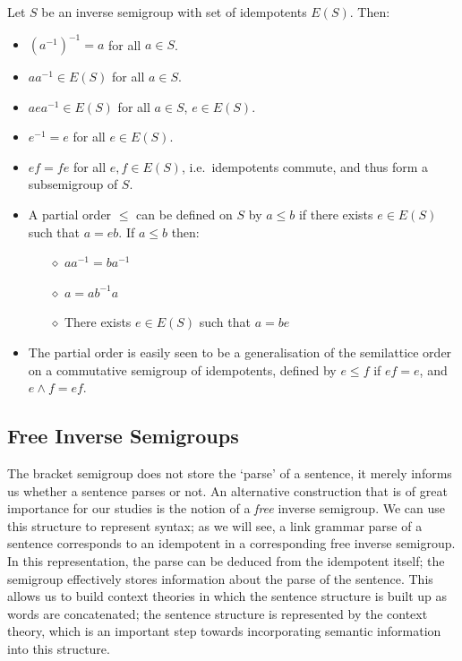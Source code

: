 Let $S$ be an inverse semigroup with set of idempotents $E(S)$. Then:
\begin{itemize}
\item $(a^{-1})^{-1} = a$ for all $a\in S$.
\item $aa^{-1} \in E(S)$ for all $a \in S$.
\item $aea^{-1} \in E(S)$ for all $a \in S$, $e\in E(S)$.
\item $e^{-1} = e$ for all $e \in E(S)$.
\item $ef=fe$ for all $e,f \in E(S)$, i.e.~idempotents commute, and thus form a subsemigroup of $S$.
\item A partial order $\le$ can be defined on $S$ by $a \le b$ if there exists $e \in E(S)$ such  that $a=eb$. If $a \le b$ then:
\begin{itemize}
\item[$\diamond$] $aa^{-1} = ba^{-1}$
\item[$\diamond$] $a = ab^{-1}a$
\item[$\diamond$] There exists $e \in E(S)$ such that $a=be$
\end{itemize}
\item The partial order is easily seen to be a generalisation of the semilattice order on a commutative semigroup of idempotents, defined by $e \le f$ if $ef = e$, and $e \land f = ef$.
\end{itemize}

\subsection{Free Inverse Semigroups}

The bracket semigroup does not store the `parse' of a sentence, it merely informs us whether a sentence parses or not. An alternative construction that is of great importance for our studies is the notion of a \emph{free} inverse semigroup. We can use this structure to represent syntax; as we will see, a link grammar parse of a sentence corresponds to an idempotent in a corresponding free inverse semigroup. In this representation, the parse can be deduced from the idempotent itself; the semigroup effectively stores information about the parse of the sentence. This allows us to build context theories in which the sentence structure is built up as words are concatenated; the sentence structure is represented by the context theory, which is an important step towards incorporating semantic information into this structure.

